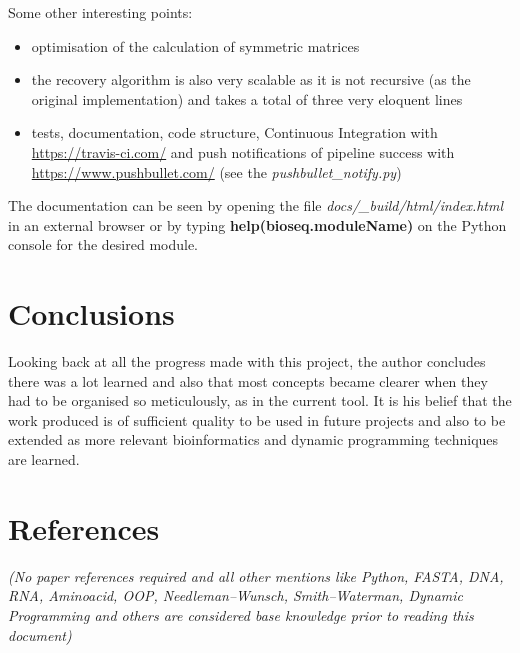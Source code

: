 \documentclass[11pt]{article}
\begin{document}
Some other interesting points:
\begin{itemize}
    \itemsep0em
    \item optimisation of the calculation of symmetric matrices
    \item the recovery algorithm is also very scalable as it is not recursive (as the original implementation) and takes a total of three very eloquent lines
    \item tests, documentation, code structure, Continuous Integration with  \url{https://travis-ci.com/} and push notifications of pipeline success with \url{https://www.pushbullet.com/} (see the \textit{pushbullet\_notify.py})
\end{itemize}


The documentation can be seen by opening the file \textit{docs/\_build/html/index.html} in an external browser or by typing \textbf{help(bioseq.moduleName)} on the Python console for the desired module. 


\section{Conclusions}
Looking back at all the progress made with this project, the author concludes there was a lot learned and also that most concepts became clearer when they had to be organised so meticulously, as in the current tool. It is his belief that the work produced is of sufficient quality to be used in future projects and also to be extended as more relevant bioinformatics and dynamic programming techniques are learned.

\section{References}
\textit{(No paper references required and all other mentions like Python, FASTA, DNA, RNA, Aminoacid, OOP, Needleman–Wunsch, Smith–Waterman, Dynamic Programming and others are considered base knowledge prior to reading this document)}
\end{document}
